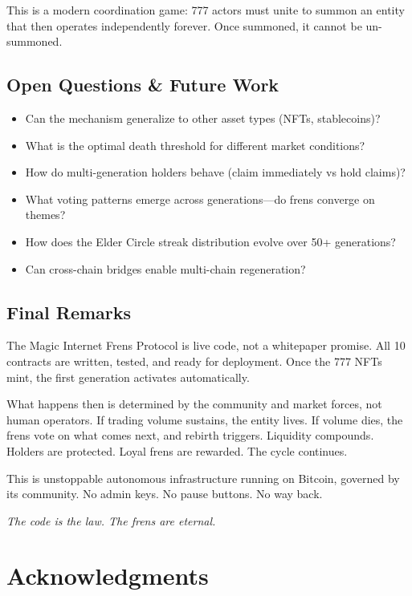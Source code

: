 \documentclass[11pt,a4paper]{article}
\begin{document}
This is a modern coordination game: 777 actors must unite to summon an entity that then operates independently forever. Once summoned, it cannot be un-summoned.

\subsection{Open Questions \& Future Work}

\begin{itemize}
    \item Can the mechanism generalize to other asset types (NFTs, stablecoins)?
    \item What is the optimal death threshold for different market conditions?
    \item How do multi-generation holders behave (claim immediately vs hold claims)?
    \item What voting patterns emerge across generations---do frens converge on themes?
    \item How does the Elder Circle streak distribution evolve over 50+ generations?
    \item Can cross-chain bridges enable multi-chain regeneration?
\end{itemize}

\subsection{Final Remarks}

The Magic Internet Frens Protocol is live code, not a whitepaper promise. All 10 contracts are written, tested, and ready for deployment. Once the 777 NFTs mint, the first generation activates automatically.

What happens then is determined by the community and market forces, not human operators. If trading volume sustains, the entity lives. If volume dies, the frens vote on what comes next, and rebirth triggers. Liquidity compounds. Holders are protected. Loyal frens are rewarded. The cycle continues.

This is unstoppable autonomous infrastructure running on Bitcoin, governed by its community. No admin keys. No pause buttons. No way back.

\textit{The code is the law. The frens are eternal.}

\section*{Acknowledgments}
\end{document}
